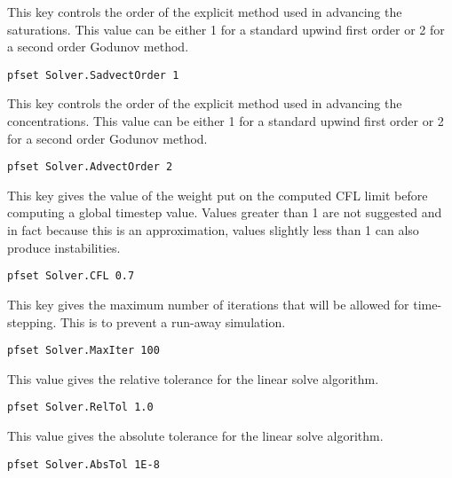 {
This key controls the order of the explicit method used in
advancing the saturations.  This value can be either 1 for
a standard upwind first order or 2 for a second order
Godunov method.
}
\begin{display}\begin{verbatim}
pfset Solver.SadvectOrder 1
\end{verbatim}\end{display}

{
This key controls the order of the explicit method used in
advancing the concentrations.  This value can be either 1 for
a standard upwind first order or 2 for a second order
Godunov method.
}
\begin{display}\begin{verbatim}
pfset Solver.AdvectOrder 2
\end{verbatim}\end{display}

{
This key gives the value of the weight put on the computed
CFL limit before computing a global timestep value.  Values
greater than 1 are not suggested and in fact because this is
an approximation, values slightly less than 1 can also produce
instabilities.
}
\begin{display}\begin{verbatim}
pfset Solver.CFL 0.7
\end{verbatim}\end{display}

{
This key gives the maximum number of iterations that will
be allowed for time-stepping.  This is to prevent a run-away
simulation.
}
\begin{display}\begin{verbatim}
pfset Solver.MaxIter 100
\end{verbatim}\end{display}



{
This value gives the relative tolerance for the linear
solve algorithm.
}
\begin{display}\begin{verbatim}
pfset Solver.RelTol 1.0
\end{verbatim}\end{display}

{
This value gives the absolute tolerance for the linear
solve algorithm.
}
\begin{display}\begin{verbatim}
pfset Solver.AbsTol 1E-8
\end{verbatim}\end{display}

